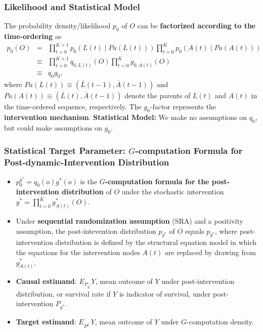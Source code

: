 \documentclass[t]{beamer}
\begin{document}
\begin{frame}
\frametitle{Likelihood and Statistical Model}
The probability density/likelihood $p_0$ of $O$ can be {\bf factorized according to the time-ordering} as 
\begin{eqnarray*}
p_0(O)&=&\prod_{t=0}^{K+1} p_0(L(t)\mid Pa(L(t)) ) \prod_{t=0}^K p_0(A(t)\mid Pa(A(t)) )\\
&\equiv& \prod_{t=0}^{K+1}q_{0,L(t)}(O)\prod_{t=0}^K g_{0,A(t)}(O)\\
&\equiv& q_0g_0,
\end{eqnarray*}
where $Pa(L(t))\equiv (\bar{L}(t-1),\bar{A}(t-1))$ and $Pa(A(t))\equiv (\bar{L}(t),\bar{A}(t-1))$ denote the parents  of $L(t)$ and $A(t)$ in the time-ordered sequence, respectively. 
The $g_0$-factor represents the {\bf intervention mechanism}.\newline
{\bf Statistical Model:}
We make no assumptions on $q_0$, but could make assumptions on $g_0$.
\end{frame}


\begin{frame}
\frametitle{Statistical Target Parameter: $G$-computation Formula for Post-dynamic-Intervention Distribution}
\begin{itemize}
\item $p^{g^*}_0=q_0(o)g^*(o)$ is the {\bf $G$-computation formula for the post-intervention distribution} of $O$ under the stochastic intervention $g^*=\prod_{t=0}^K g^*_{A(t)}(O)$.
\item Under {\bf sequential randomization assumption} (SRA) and a positivity assumption, the post-intevention distribution $p_{g^*}$ of $O$ equals $p_{g^*}$, where post-intervention distribution is defined by the structural equation model in which the equations for the intervention nodes $A(t)$ are replaced by drawing from $g^*_{A(t)}$.
\item {\bf Causal estimand}: $E_{P_{g^*}}Y$, mean outcome of $Y$ under post-intervention distribution, or survival rate if $Y$ is indicator of survival, under  post-intervention $P_{g^*}$.
\item {\bf Target estimand}: $E_{P^{g^*}}Y$, mean outcome of $Y$ under $G$-computation density.
\end{itemize}
\end{frame}
\end{document}
